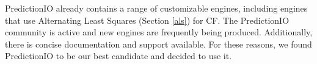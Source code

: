 PredictionIO already contains a range of customizable engines, including engines that use Alternating Least Squares (Section \ref{als}) for CF. The PredictionIO community is active and new engines are frequently being produced. Additionally, there is concise documentation and support available. For these reasons, we found PredictionIO to be our best candidate and decided to use it. 





